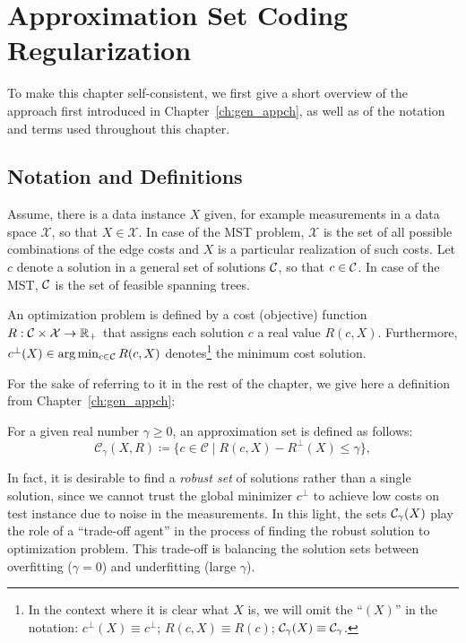 \section{Approximation Set Coding Regularization}
\label{regularization_gen}

To make this chapter self-consistent, we first give a short overview of the approach
first introduced in Chapter~\ref{ch:gen_appch}, as well as of the
notation and terms used throughout this chapter.

\subsection{Notation and Definitions}

Assume, there is a data instance $X$ given, for example
measurements in a data space $\mathcal{X}$, so that $X \in
\mathcal{X}$. In case of the MST problem, $\mathcal{X}$ is the set of
all possible combinations of the edge costs and $X$ is a particular realization
of such costs. Let $c$ denote a solution in a general set of solutions ${\cal C}$, so
that $c \in {\cal C}$. In case of the MST, ${\cal C}$ is the set of feasible spanning trees.

An optimization problem is defined by a cost (objective) function $R:
{\cal C}\times\mathcal{X}\rightarrow \mathbb{R}_{+}$ that assigns
each solution $c$ a real value $R(c,X)$. Furthermore,
$c^{\bot}(X) \in \arg\min_{c \in {\cal C}} R(c, X)$
denotes\footnote{In the context where it is clear what $X$ is, we
will omit the ``$(X)$'' in the notation: $c^\bot(X) \equiv
c^\bot$; $R(c,X) \equiv R(c)$; ${\cal C}_\gamma(X) \equiv
{\cal C}_\gamma$.} the minimum cost solution.

For the sake of referring to it in the rest of the chapter, we give here a
definition from Chapter~\ref{ch:gen_appch}:
\begin{definition}
\label{def:mst_ch_approximation_set}
For a given real number $\gamma \ge 0$, an approximation set is defined as follows:
\begin{equation}
  \mathcal{C}_\gamma (X, R) \coloneqq 
  \{c \in \mathcal{C} \mid R(c, X) - R^\bot(X) \le \gamma\},
\end{equation}
\end{definition}

In fact, it is desirable to find a \emph{robust set} of solutions
rather than a single solution, since we cannot trust the global
minimizer $c^\bot$ to achieve low costs on test instance due to noise
in the measurements. In this light, the sets ${\cal C}_\gamma(X)$ play
the role of a ``trade-off agent'' in the process of finding the robust
solution to optimization problem. This trade-off is 
balancing the solution sets between overfitting ($\gamma = 0$) and underfitting (large
$\gamma$).

